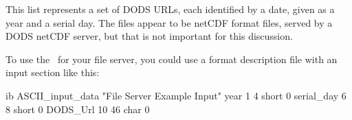 This list represents a set of DODS URLs, each identified by a date,
given as a year and a serial day.  The files appear to be netCDF
format files, served by a DODS netCDF server, but that is not
important for this discussion.

To use the \ffs\ for your file server, you could use a format
description file with an input section like this:

\begin{vcode}{ib}
ASCII_input_data "File Server Example Input"
year 1 4 short 0
serial_day 6 8 short 0
DODS_Url 10 46 char 0
\end{vcode}

\begin{comment}
\section{File Server Functions}
\label{ss-fns}




Yes, but it may take a while to get there. Right now the grid_select function
*is* available to every server, while the DODS_Date, DODS_Time,
DODS_DateTime, date, time and datetime function are only in the FF server.
I'm not sure when those will mve into the general server population.





 >"Paul" == Paul Hemenway <paul@koko.gso.uri.edu> writes:

 > Hi, Dan,
 >>> loaddods('http://koko.gso.uri.edu/cgi-bin/nph-ff/servers/nscat/fsu/fsutestfs.dat?DODS_URL,DODS_Date()&date("1996/366","1997/006")')          

 > Reading: http://koko.gso.uri.edu/cgi-bin/nph-ff/servers/nscat/fsu/fsutestfs.dat
 >   Constraint: DODS_URL,DODS_Date()&date("1996/366","1997/006")
 > Server version: dods/2.21
 > Creating string vector `DODS_Date'.
 > Creating string vector `DODS_URL'.

 > DODS_URL                                           

 > DODS_URL =

Oh, Bad docs on my part. Add the name of the constructor variable that should
contain the DODS_Date variable. In the following dataset:

    [dcz:/usr/local/DODS/src/dap-2.23] ./geturl -d http://koko.gso.uri.edu/cgi-bin/nph-ff/servers/nscat/fsu/fsutestfs.dat
    Dataset {
        Sequence {
            Int32 year;
            Int32 day;
            String DODS_URL;
        } FSU_nscat1;
    } fsutestfs;


\end{comment}
